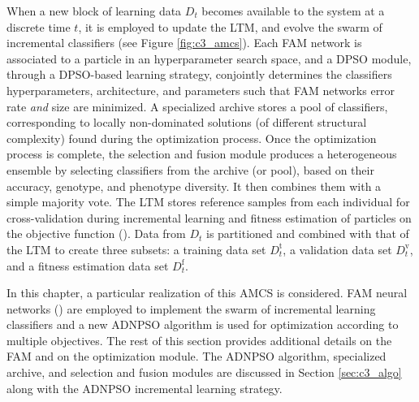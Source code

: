 \begin{figure*}[t]
  \centering
  \caption{Evolution over time of the adaptive multiclassifier system (AMCS) in a generic incremental learning scenario, where new blocks of data are used to update a swarm of classifiers.
Let $D_1$, $D_2$, ... be blocks of training data that become available at different instants in time $t=1,2,...$.
The AMCS starts with an initial hypothesis $hyp_0$ according to the prior knowledge of the classification environment.
On the basis of new data blocks $D_t$, each hypothesis $hyp_{t-1}$ are updated to $hyp_t$ by the AMCS}
	\label{fig:c3_amcs}
\end{figure*}

When a new block of learning data $D_t$ becomes available to the system at a discrete time $t$, it is employed to update the LTM, and evolve the swarm of incremental classifiers (see Figure \ref{fig:c3_amcs}).
Each FAM network is associated to a particle in an hyperparameter search space, and a DPSO module, through a DPSO-based learning strategy, conjointly determines the classifiers hyperparameters, architecture, and parameters such that FAM networks error rate \emph{and} size are minimized.
A specialized archive stores a pool of classifiers, corresponding to locally non-dominated solutions (of different structural complexity) found during the optimization process.
Once the optimization process is complete, the selection and fusion module produces a heterogeneous ensemble by selecting classifiers from the archive (or pool), based on their accuracy, genotype, and phenotype diversity.
It then combines them with a simple majority vote.
The LTM stores reference samples from each individual for cross-validation during incremental learning and fitness estimation of particles on the objective function (\cite{connolly10}).
Data from $D_t$ is partitioned and combined with that of the LTM to create three subsets: a training data set $D_t^\text{t}$, a validation data set $D_t^\text{v}$, and a fitness estimation data set $D_t^\text{f}$. 

In this chapter, a particular realization of this AMCS is considered.
FAM neural networks (\cite{carpenter92}) are employed to implement the swarm of incremental learning classifiers and a new ADNPSO algorithm is used for optimization according to multiple objectives.
The rest of this section provides additional details on the FAM and on the optimization module.
The ADNPSO algorithm, specialized archive, and selection and fusion modules are discussed in Section \ref{sec:c3_algo} along with the ADNPSO incremental learning strategy.

